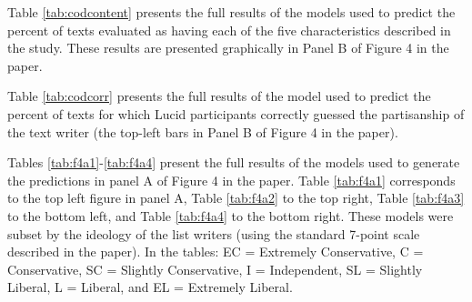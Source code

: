 \documentclass[11pt]{article}
\begin{document}
Table \ref{tab:codcontent} presents the full results of the models used to predict the percent of texts evaluated as having each of the five characteristics described in the study. These results are presented graphically in Panel B of Figure 4 in the paper.

Table \ref{tab:codcorr} presents the full results of the model used to predict the percent of texts for which Lucid participants correctly guessed the partisanship of the text writer (the top-left bars in Panel B of Figure 4 in the paper).

Tables \ref{tab:f4a1}-\ref{tab:f4a4} present the full results of the models used to generate the predictions in panel A of Figure 4 in the paper. Table \ref{tab:f4a1} corresponds to the top left figure in panel A, Table \ref{tab:f4a2} to the top right, Table \ref{tab:f4a3} to the bottom left, and Table \ref{tab:f4a4} to the bottom right. These models were subset by the ideology of the list writers (using the standard 7-point scale described in the paper). In the tables: EC = Extremely Conservative, C = Conservative, SC = Slightly Conservative, I = Independent, SL = Slightly Liberal, L = Liberal, and EL = Extremely Liberal.
\end{document}
